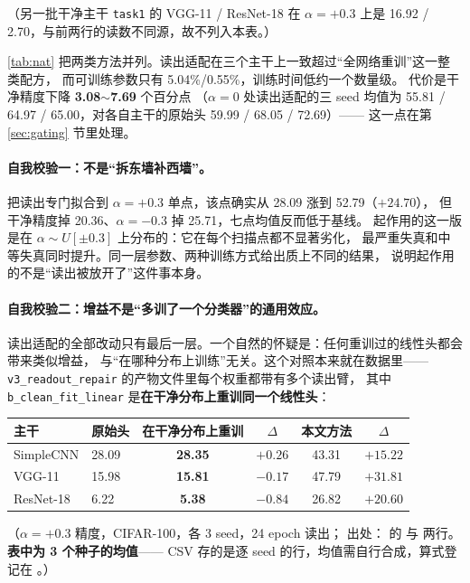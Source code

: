 \documentclass[11pt,a4paper]{ctexart}
\begin{document}
（另一批干净主干 \texttt{task1} 的 VGG-11 / ResNet-18 在 $\alpha=+0.3$ 上是 16.92 / 2.70，与前两行的读数不同源，故不列入本表。）

\cref{tab:nat} 把两类方法并列。读出适配在三个主干上一致超过“全网络重训”这一整类配方，
而可训练参数只有 5.04\%/0.55\%，训练时间低约一个数量级。
代价是干净精度下降 \textbf{3.08$\sim$7.69} 个百分点
（$\alpha=0$ 处读出适配的三 seed 均值为 55.81 / 64.97 / 65.00，对各自主干的原始头 59.99 / 68.05 / 72.69）——
这一点在第 \ref{sec:gating} 节里处理。

\paragraph{自我校验一：不是“拆东墙补西墙”。}
把读出专门拟合到 $\alpha=+0.3$ 单点，该点确实从 28.09 涨到 52.79（$+24.70$），
但干净精度掉 20.36、$\alpha=-0.3$ 掉 25.71，七点均值反而低于基线。
起作用的这一版是在 $\alpha\sim U[\pm0.3]$ 上分布的：它在每个扫描点都不显著劣化，
最严重失真和中等失真同时提升。同一层参数、两种训练方式给出质上不同的结果，
说明起作用的不是“读出被放开了”这件事本身。

\paragraph{自我校验二：增益不是“多训了一个分类器”的通用效应。}
读出适配的全部改动只有最后一层。一个自然的怀疑是：任何重训过的线性头都会带来类似增益，
与“在哪种分布上训练”无关。这个对照本来就在数据里——
\texttt{v3\_readout\_repair} 的产物文件里每个权重都带有多个读出臂，
其中 \texttt{b\_clean\_fit\_linear} 是\textbf{在干净分布上重训同一个线性头}：

\begin{center}
\small
\begin{tabular}{llcccc}
\toprule
主干 & 原始头 & \textbf{在干净分布上重训} & $\Delta$ & 本文方法 & $\Delta$ \\
\midrule
SimpleCNN & 28.09 & \textbf{28.35} & $+0.26$ & 43.31 & $+15.22$ \\
VGG-11 & 15.98 & \textbf{15.81} & $-0.17$ & 47.79 & $+31.81$ \\
ResNet-18 & 6.22 & \textbf{5.38} & $-0.84$ & 26.82 & $+20.60$ \\
\bottomrule
\end{tabular}
\end{center}

（$\alpha=+0.3$ 精度，CIFAR-100，各 3 seed，24 epoch 读出；
出处： 的 
与  两行。\textbf{表中为 3 个种子的均值}——
CSV 存的是逐 seed 的行，均值需自行合成，算式登记在 。）
\end{document}
